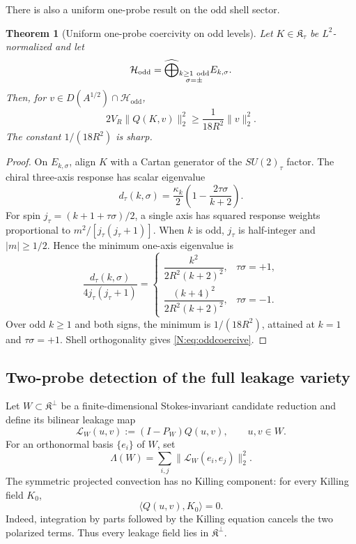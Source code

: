 \documentclass[
 aps,
 prd,
 reprint,
 amsmath,
 amssymb,
 nofootinbib,
 superscriptaddress
]{revtex4-2}
\newtheorem{theorem}{Theorem}[section]
\theoremstyle{definition}
\theoremstyle{remark}
\begin{document}
There is also a uniform one-probe result on the odd shell sector.

\begin{theorem}[Uniform one-probe coercivity on odd levels]
\label{N:thm:oddcoercive}
Let \(K\in\mathfrak K_\tau\) be \(L^2\)-normalized and let
\[
 \mathcal H_{\mathrm{odd}}
 =
 \widehat{\bigoplus}_{\substack{k\ge1\ {\rm odd}\\\sigma=\pm}}
 E_{k,\sigma}.
\]
Then, for
\(v\in D(A^{1/2})\cap\mathcal H_{\mathrm{odd}}\),
\begin{equation}
 \boxed{
 2V_R\|Q(K,v)\|_2^2
 \ge
 \frac{1}{18R^2}\|v\|_2^2.
 }
 \label{N:eq:oddcoercive}
\end{equation}
The constant \(1/(18R^2)\) is sharp.
\end{theorem}

\begin{proof}
On \(E_{k,\sigma}\), align \(K\) with a Cartan generator of the
\(SU(2)_\tau\) factor.  The chiral three-axis response has scalar eigenvalue
\[
 d_\tau(k,\sigma)
 =
 \frac{\kappa_k}{2}
 \left(1-\frac{2\tau\sigma}{k+2}\right).
\]
For spin \(j_\tau=(k+1+\tau\sigma)/2\), a single axis has squared response
weights proportional to
\(m^2/[j_\tau(j_\tau+1)]\).  When \(k\) is odd,
\(j_\tau\) is half-integer and \(|m|\ge1/2\).  Hence the minimum one-axis
eigenvalue is
\[
 \frac{d_\tau(k,\sigma)}
      {4j_\tau(j_\tau+1)}
 =
 \begin{cases}
 \dfrac{k^2}{2R^2(k+2)^2},&\tau\sigma=+1,\\[2mm]
 \dfrac{(k+4)^2}{2R^2(k+2)^2},&\tau\sigma=-1.
 \end{cases}
\]
Over odd \(k\ge1\) and both signs, the minimum is
\(1/(18R^2)\), attained at \(k=1\) and \(\tau\sigma=+1\).
Shell orthogonality gives \eqref{N:eq:oddcoercive}.
\end{proof}

\subsection{Two-probe detection of the full leakage variety}

Let \(W\subset\mathfrak K^\perp\) be a finite-dimensional Stokes-invariant
candidate reduction and define its bilinear leakage map
\begin{equation}
 \mathcal L_W(u,v)
 :=
 (I-P_W)Q(u,v),
 \qquad u,v\in W.
 \label{N:eq:leakmap}
\end{equation}
For an orthonormal basis \(\{e_i\}\) of \(W\), set
\[
 \Lambda(W)
 =
 \sum_{i,j}\|\mathcal L_W(e_i,e_j)\|_2^2.
\]
The symmetric projected convection has no Killing component:
for every Killing field \(K_0\),
\begin{equation}
 \langle Q(u,v),K_0\rangle=0.
 \label{N:eq:noKillingQ}
\end{equation}
Indeed, integration by parts followed by the Killing equation cancels the
two polarized terms.  Thus every leakage field lies in
\(\mathfrak K^\perp\).
\end{document}
